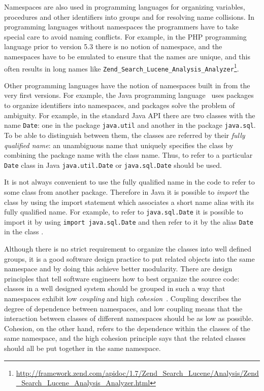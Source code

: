 Namespaces are also used in programming languages for organizing
variables, procedures and other identifiers into groups and
for resolving name collisions. In programming languages without
namespaces the programmers have to take special care to avoid
naming conflicts. For example, in the PHP programming language
prior to version 5.3 \cite{mcarthur2008php6} there is no notion of namespace, and
the namespaces have to be emulated to ensure that the names
are unique, and this often results in long names like
\verb|Zend_Search_Lucene_Analysis_Analyzer|\footnote{\url{http://framework.zend.com/apidoc/1.7/Zend_Search_Lucene/Analysis/Zend_Search_Lucene_Analysis_Analyzer.html}}.


Other programming languages have the notion of namespaces built in
from the very first versions. For example, the Java programming
language~\cite{gosling2014java} uses packages to organize identifiers into
namespaces, and packages solve the problem of ambiguity. For example,
in the standard Java API there are two classes with the name \texttt{Date}:
one in the package \texttt{java.util} and another in the package \texttt{java.sql}.
To be able to distinguish between them, the classes are referred by their
\emph{fully qualified name}: an unambiguous name that uniquely specifies the class
by combining the package name with the class name. Thus, to refer to a particular
\texttt{Date} class in Java  \texttt{java.util.Date} or  \texttt{java.sql.Date}
should be used.

It is not always convenient to use the fully qualified name in the code to
refer to some class from another package. Therefore in Java it is possible to
\emph{import} the class by using the import statement which associates
a short name alias with its fully qualified name.
For example, to refer to \texttt{java.sql.Date} it is possible to import
it by using \texttt{import java.sql.Date} and then refer to it by the alias
\texttt{Date} in the class \cite{gosling2014java}.


Although there is no strict requirement to organize the classes into
well defined groups, it is a good software design practice to put
related objects into the same namespace and by doing this achieve
better modularity. There are design principles that tell software engineers
how to best organize the source code: classes in a well designed system
should be grouped in such a way that namespaces
exhibit low \emph{coupling} and high \emph{cohesion}~\cite{larman2005applying}.
Coupling describes the degree of dependence between namespaces, and
low coupling means that the interaction between classes of different
namespaces should be as low as possible. Cohesion, on the other hand,
refers to the dependence within the classes of the same namespace,
and the high cohesion principle says that the related classes
should all be put together in the same namespace.

